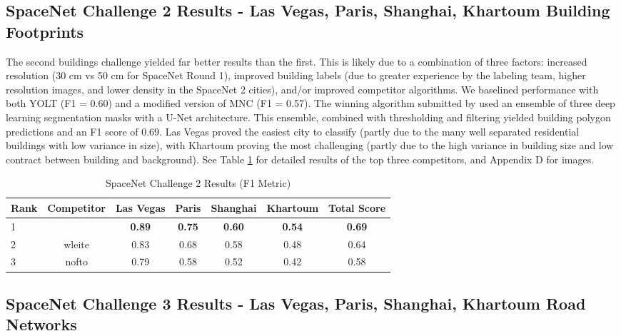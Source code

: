 \documentclass{article}
\begin{document}
\subsection{SpaceNet Challenge 2 Results - Las Vegas, Paris, Shanghai, Khartoum Building Footprints}

The second buildings challenge yielded far better results than the first.  This is likely due to a combination of three factors: increased resolution (30 cm vs 50 cm for SpaceNet Round 1), improved building labels (due to greater experience by the labeling team, higher resolution images, and lower density in the SpaceNet 2 cities), and/or improved competitor algorithms.  
We baselined performance with both YOLT (F1 = 0.60) and a modified version of MNC \cite{mnc} (F1 = 0.57).  
The winning algorithm submitted  by  \cite{xdxd} used an ensemble of three deep learning segmentation masks with a U-Net \cite{unet} architecture.  This ensemble, combined with thresholding and filtering yielded building polygon predictions and an F1 score of 0.69.
Las Vegas proved the easiest city to classify (partly due to the many well separated residential buildings with low variance in size), with Khartoum proving the most challenging (partly due to the high variance in building size and low contract between building and background).  See Table \ref{tab:sn2_res} for detailed results of the top three competitors, and Appendix D for images.

\begin{table}
  \caption{SpaceNet Challenge 2 Results (F1 Metric)}
  \label{tab:sn2_res}
  \centering
   \begin{tabular}{lcccccc}
    \toprule
    Rank & Competitor & Las Vegas & Paris & Shanghai & Khartoum & Total Score \\
    \hline
    1 &  & \bf{0.89} & \bf{0.75} & \bf{0.60} & \bf{0.54} & \bf{0.69} \\
    2 & wleite & 0.83 & 0.68 & 0.58 & 0.48 & 0.64 \\
    3 & nofto & 0.79 & 0.58 & 0.52 & 0.42 & 0.58 \\  
    \bottomrule
  \end{tabular}
\end{table}






\subsection{SpaceNet Challenge 3 Results - Las Vegas, Paris, Shanghai, Khartoum Road Networks}
\end{document}

